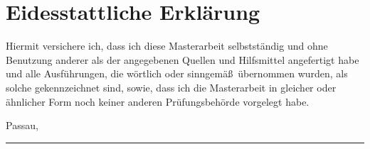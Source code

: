\chapter{Eidesstattliche Erkl\"arung}


	Hiermit versichere ich, dass ich diese Masterarbeit selbstständig und ohne Benutzung anderer als der angegebenen Quellen und Hilfsmittel angefertigt habe und alle Ausführungen, die wörtlich oder sinngemä\ss ~übernommen wurden, als solche gekennzeichnet sind, sowie, dass ich die Masterarbeit in gleicher oder ähnlicher Form noch keiner anderen Prüfungsbehörde vorgelegt habe.


	\vspace{3cm}


	Passau, \thedate


	\vspace{2cm}


	\parbox{8cm}{
		\hrule \strut \theauthor
	}
